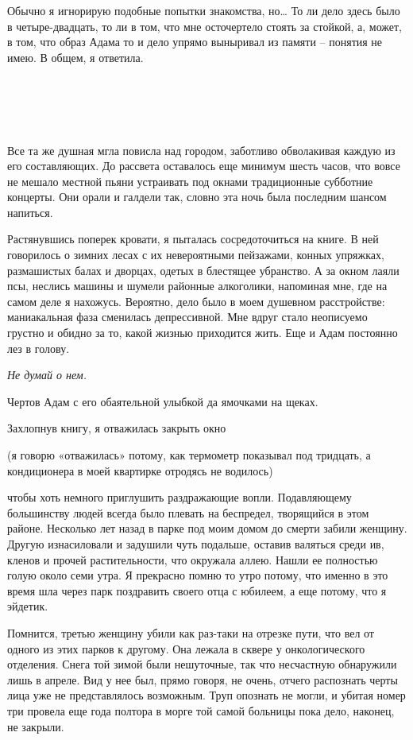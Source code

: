\documentclass[
]{book}
\begin{document}
Обычно я игнорирую подобные попытки знакомства, но\ldots{} То ли дело здесь было в четыре-двадцать, то ли в том, что мне осточертело стоять за стойкой, а, может, в том, что образ Адама то и дело упрямо выныривал из памяти -- понятия не имею. В общем, я ответила.

\hypertarget{chapter-3}{%
\chapter{~}\label{chapter-3}}

Все та же душная мгла повисла над городом, заботливо обволакивая каждую из его составляющих. До рассвета оставалось еще минимум шесть часов, что вовсе не мешало местной пьяни устраивать под окнами традиционные субботние концерты. Они орали и галдели так, словно эта ночь была последним шансом напиться.

Растянувшись поперек кровати, я пыталась сосредоточиться на книге. В ней говорилось о зимних лесах с их невероятными пейзажами, конных упряжках, размашистых балах и дворцах, одетых в блестящее убранство. А за окном лаяли псы, неслись машины и шумели районные алкоголики, напоминая мне, где на самом деле я нахожусь. Вероятно, дело было в моем душевном расстройстве: маниакальная фаза сменилась депрессивной. Мне вдруг стало неописуемо грустно и обидно за то, какой жизнью приходится жить. Еще и Адам постоянно лез в голову.

\emph{Не думай о нем.}

Чертов Адам с его обаятельной улыбкой да ямочками на щеках.

Захлопнув книгу, я отважилась закрыть окно

(я говорю «отважилась» потому, как термометр показывал под тридцать, а кондиционера в моей квартирке отродясь не водилось)

чтобы хоть немного приглушить раздражающие вопли. Подавляющему большинству людей всегда было плевать на беспредел, творящийся в этом районе. Несколько лет назад в парке под моим домом до смерти забили женщину. Другую изнасиловали и задушили чуть подальше, оставив валяться среди ив, кленов и прочей растительности, что окружала аллею. Нашли ее полностью голую около семи утра. Я прекрасно помню то утро потому, что именно в это время шла через парк поздравить своего отца с юбилеем, а еще потому, что я эйдетик.

Помнится, третью женщину убили как раз-таки на отрезке пути, что вел от одного из этих парков к другому. Она лежала в сквере у онкологического отделения. Снега той зимой были нешуточные, так что несчастную обнаружили лишь в апреле. Вид у нее был, прямо говоря, не очень, отчего распознать черты лица уже не представлялось возможным. Труп опознать не могли, и убитая номер три провела еще года полтора в морге той самой больницы пока дело, наконец, не закрыли.
\end{document}
